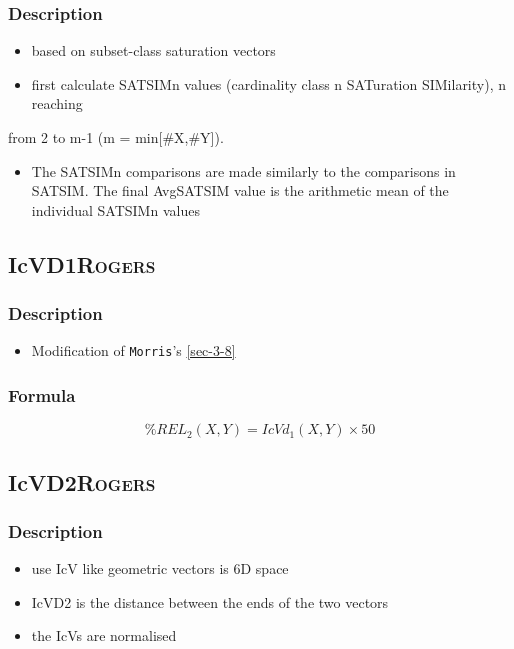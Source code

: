 \documentclass[11pt]{article}
\begin{document}
\subsubsection{Description}
\label{sec-3-25-1}
\begin{itemize}
\item based on subset-class saturation vectors
\item first calculate SATSIMn values (cardinality class n SATuration
SIMilarity), n reaching
\end{itemize}
from 2 to m-1 (m = min[\#X,\#Y]).
\begin{itemize}
\item The SATSIMn comparisons are made similarly to the comparisons in
SATSIM. The final AvgSATSIM value is the arithmetic mean of the
individual SATSIMn values
\end{itemize}

\subsection{IcVD1\hfill{}\textsc{Rogers}}
\label{sec-3-26}
\subsubsection{Description}
\label{sec-3-26-1}
\begin{itemize}
\item Modification of \texttt{Morris}'s \ref{sec-3-8}
\end{itemize}

\subsubsection{Formula}
\label{sec-3-26-2}
$$\%REL_2(X,Y)=IcVd_1(X,Y)\times50 $$

\subsection{IcVD2\hfill{}\textsc{Rogers}}
\label{sec-3-27}
\subsubsection{Description}
\label{sec-3-27-1}
\begin{itemize}
\item use IcV like geometric vectors is 6D space
\item IcVD2 is the distance between the ends of the two vectors
\item the IcVs are normalised
\end{itemize}
\end{document}
